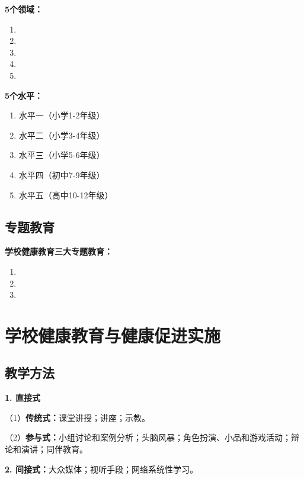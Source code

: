 \begin{keybox}
\textbf{5个领域：}

\begin{enumerate}[leftmargin=*]
    \item {}
    \item {}
    \item {}
    \item {}
    \item {}
\end{enumerate}

\textbf{5个水平：}

\begin{enumerate}[leftmargin=*]
    \item 水平一（小学1-2年级）
    \item 水平二（小学3-4年级）
    \item 水平三（小学5-6年级）
    \item 水平四（初中7-9年级）
    \item 水平五（高中10-12年级）
\end{enumerate}
\end{keybox}

\subsection{专题教育}

\begin{keybox}
\textbf{学校健康教育三大专题教育：}

\begin{enumerate}[leftmargin=*]
    \item {}
    \item {}
    \item {}
\end{enumerate}
\end{keybox}

\section{学校健康教育与健康促进实施}

\subsection{教学方法}

\begin{keybox}
\textbf{1. 直接式}

（1）\textbf{传统式：}课堂讲授；讲座；示教。

（2）\textbf{参与式：}小组讨论和案例分析；头脑风暴；角色扮演、小品和游戏活动；辩论和演讲；同伴教育。

\textbf{2. 间接式：}大众媒体；视听手段；网络系统性学习。
\end{keybox}

